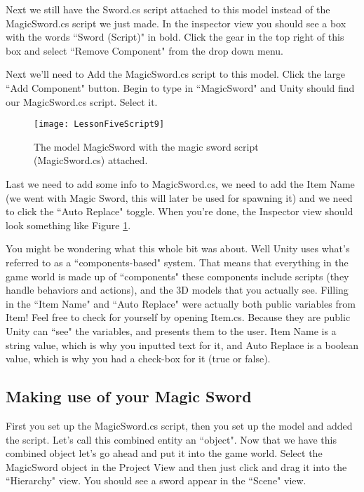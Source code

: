 \documentclass{article}
\begin{document}
Next we still have the Sword.cs script attached to this model instead of the MagicSword.cs script we just made. In the inspector view you should see a box with the words ``Sword (Script)" in bold. Click the gear in the top right of this box and select ``Remove Component" from the drop down menu. 

Next we'll need to Add the MagicSword.cs script to this model. Click the large ``Add Component" button. Begin to type in ``MagicSword" and Unity should find our MagicSword.cs script. Select it. 

\begin{figure}
  \texttt{[image: LessonFiveScript9]}
  \caption{The model MagicSword with the magic sword script (MagicSword.cs) attached.}
  \label{fig:LessonFiveScript9}
\end{figure}

Last we need to add some info to MagicSword.cs, we need to add the Item Name (we went with Magic Sword, this will later be used for spawning it) and we need to click the ``Auto Replace" toggle. When you're done, the Inspector view should look something like Figure \ref{fig:LessonFiveScript9}.

You might be wondering what this whole bit was about. Well Unity uses what's referred to as a ``components-based" system. That means that everything in the game world is made up of ``components" these components include scripts (they handle behaviors and actions), and the 3D models that you actually see. Filling in the ``Item Name" and ``Auto Replace" were actually both public variables from Item! Feel free to check for yourself by opening Item.cs. Because they are public Unity can ``see" the variables, and presents them to the user. Item Name is a string value, which is why you inputted text for it, and Auto Replace is a boolean value, which is why you had a check-box for it (true or false). 

\subsection{Making use of your Magic Sword}

First you set up the MagicSword.cs script, then you set up the model and added the script. Let's call this combined entity an ``object". Now that we have this combined object let's go ahead and put it into the game world. Select the MagicSword object in the Project View and then just click and drag it into the ``Hierarchy" view. You should see a sword appear in the ``Scene" view. 
\end{document}
